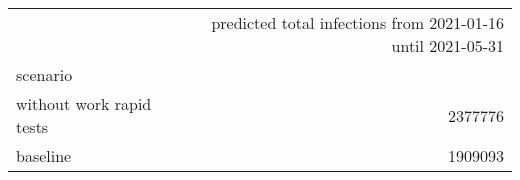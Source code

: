 \begin{tabular}{lr}
\toprule
{} &  predicted total infections from 2021-01-16 until 2021-05-31 \\
scenario                  &                                                              \\
\midrule
 without work rapid tests &                                            2377776 \\
 baseline                 &                                            1909093 \\
\bottomrule
\end{tabular}
